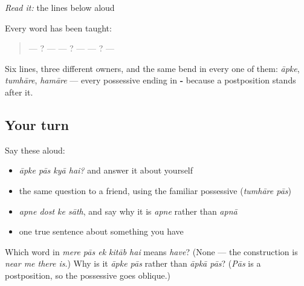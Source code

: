\begin{tcolorbox}[breakable,skin=enhanced,colback=orange!6,colframe=orange!45!black,boxrule=0.5pt,arc=1mm,left=6pt,right=6pt,top=4pt,bottom=4pt,fonttitle=\bfseries,title={Read this}]
\emph{Read it:} the lines below aloud

Every word has been taught:

\begin{quote}
—    ? —      —    ? —      —     ? —     
\end{quote}

Six lines, three different owners, and the same bend in every one of them: \emph{āpke}, \emph{tumhāre}, \emph{hamāre} — every possessive ending in \textbf{-} because a postposition stands after it.
\end{tcolorbox}

\subsection*{Your turn}
Say these aloud:

\begin{itemize}
\raggedright
  \item \emph{āpke pās kyā hai?} and answer it about yourself
  \item the same question to a friend, using the familiar possessive (\emph{tumhāre pās})
  \item \emph{apne dost ke sāth}, and say why it is \emph{apne} rather than \emph{apnā}
  \item one true sentence about something you have
\end{itemize}

\begin{tcolorbox}[breakable,colback=teal!4,colframe=teal!35!black,title={Before you move on}]
Which word in \emph{mere pās ek kitāb hai} means \emph{have}? (None — the construction is \emph{near me there is}.) Why is it \emph{āpke pās} rather than \emph{āpkā pās}? (\emph{Pās} is a postposition, so the possessive goes oblique.)
\end{tcolorbox}
